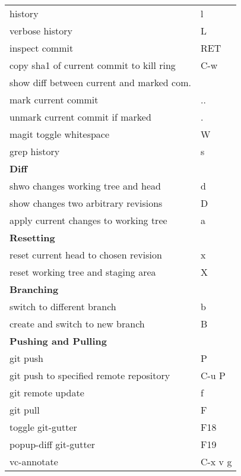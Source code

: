\documentclass[english]{rcalibrionecolumn}
\begin{document}
\begin{longtable}{ll}
 history                                    &  l                  \\
 verbose history                            &  L                  \\
 inspect commit                             &  RET                \\
 copy sha1 of current commit to kill ring   &  C-w                \\
 show diff between current and marked com.  &                     \\
 mark current commit                        &  ..                 \\
 unmark current commit if marked            &  .                  \\
 magit toggle whitespace                    &  W                  \\
 grep history                               &  s                  \\
\hline
 \textbf{Diff}                              &                     \\
 shwo changes working tree and head         &  d                  \\
 show changes two arbitrary revisions       &  D                  \\
 apply current changes to working tree      &  a                  \\
\hline
 \textbf{Resetting}                         &                     \\
 reset current head to chosen revision      &  x                  \\
 reset working tree and staging area        &  X                  \\
\hline
 \textbf{Branching}                         &                     \\
 switch to different branch                 &  b                  \\
 create and switch to new branch            &  B                  \\
\hline
 \textbf{Pushing and Pulling}               &                     \\
 git push                                   &  P                  \\
 git push to specified remote repository    &  C-u P              \\
 git remote update                          &  f                  \\
 git pull                                   &  F                  \\
\hline
 toggle git-gutter                          &  F18                \\
 popup-diff git-gutter                      &  F19                \\
 vc-annotate                                &  C-x v g            \\
\end{longtable}
\end{document}
